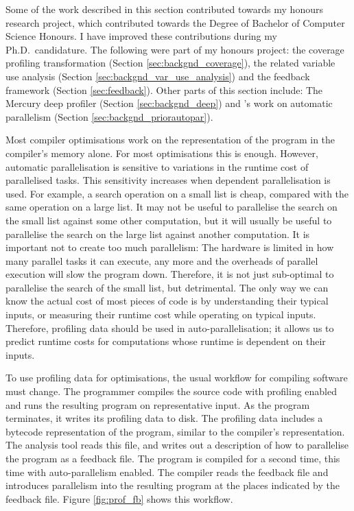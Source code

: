 

Some of the work described in this section contributed towards my honours
research project,
which contributed towards 
the Degree of Bachelor of Computer Science Honours.
I have improved these contributions during my Ph.D.\
candidature.
The following were part of my honours project:
the coverage profiling transformation (Section \ref{sec:backgnd_coverage}),
the related variable use analysis (Section \ref{sec:backgnd_var_use_analysis})
and the feedback framework (Section \ref{sec:feedback}).
Other parts of this section include:
The Mercury deep profiler \citep{conway:2001:mercury-deep} (Section
\ref{sec:backgnd_deep}) and
\citet{tannier:2007:parallel_mercury}'s work on automatic parallelism
(Section \ref{sec:backgnd_priorautopar}).

Most compiler optimisations work on the representation of the program in
the compiler's memory alone.
For most optimisations this is enough.
However,
automatic parallelisation is sensitive to variations in the runtime cost of
parallelised tasks.
This sensitivity increases when dependent parallelisation is used.
For example,
a search operation on a small list is cheap, compared with the same operation on
a large list.
It may not be useful to parallelise the search on the small list against some
other computation,
but it will usually be useful to parallelise the search on the large list
against another computation.
It is important not to create too much parallelism:
The hardware is limited in how many parallel tasks it can execute,
any more and the overheads of parallel execution will slow the program down.
Therefore, it is not just sub-optimal to parallelise the search of the small list,
but detrimental.
The only way we can know the actual cost of most pieces of code
is by understanding their typical inputs,
or measuring their runtime cost while operating on typical inputs.
Therefore,
profiling data should be used in auto-parallelisation;
it allows us to predict runtime costs for computations whose
runtime is dependent on their inputs.

To use profiling data for optimisations,
the usual workflow for compiling software must change.
The programmer compiles the source code with profiling enabled and runs the
resulting program on representative input.
As the program terminates,
it writes its profiling data to disk.
The profiling data includes a bytecode representation of the program,
similar to the compiler's representation.
The analysis tool reads this file,
and writes out a description of how to parallelise the program as a feedback
file.
The program is compiled for a second time,
this time with auto-parallelism enabled.
The compiler reads the feedback file and introduces parallelism into the
resulting program at the places indicated by the feedback file.
Figure \ref{fig:prof_fb} shows this workflow.

